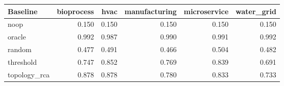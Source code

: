 \begin{tabular}{lrrrrr}
\toprule
Baseline & bioprocess & hvac & manufacturing & microservice & water\_grid \\
\midrule
noop & 0.150 & 0.150 & 0.150 & 0.150 & 0.150 \\
oracle & 0.992 & 0.987 & 0.990 & 0.991 & 0.992 \\
random & 0.477 & 0.491 & 0.466 & 0.504 & 0.482 \\
threshold & 0.747 & 0.852 & 0.769 & 0.839 & 0.691 \\
topology\_rca & 0.878 & 0.878 & 0.780 & 0.833 & 0.733 \\
\bottomrule
\end{tabular}
